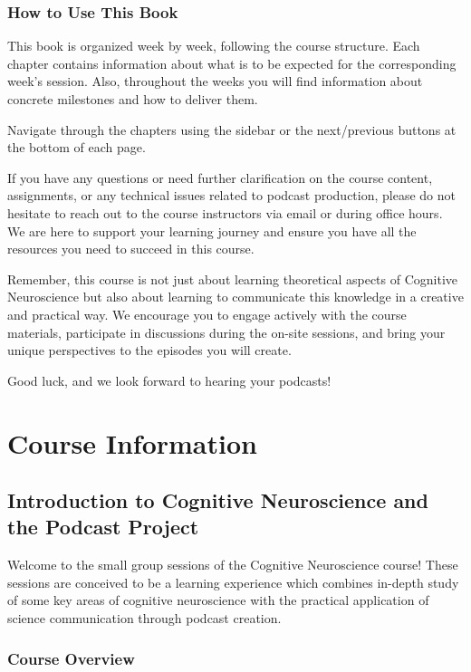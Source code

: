 \documentclass[
  letterpaper,
  DIV=11,
  numbers=noendperiod]{scrreprt}
\begin{document}
\section{How to Use This Book}\label{how-to-use-this-book}

This book is organized week by week, following the course structure.
Each chapter contains information about what is to be expected for the
corresponding week's session. Also, throughout the weeks you will find
information about concrete milestones and how to deliver them.

Navigate through the chapters using the sidebar or the next/previous
buttons at the bottom of each page.

If you have any questions or need further clarification on the course
content, assignments, or any technical issues related to podcast
production, please do not hesitate to reach out to the course
instructors via email or during office hours. We are here to support
your learning journey and ensure you have all the resources you need to
succeed in this course.

Remember, this course is not just about learning theoretical aspects of
Cognitive Neuroscience but also about learning to communicate this
knowledge in a creative and practical way. We encourage you to engage
actively with the course materials, participate in discussions during
the on-site sessions, and bring your unique perspectives to the episodes
you will create.

Good luck, and we look forward to hearing your podcasts!

\part{Course Information}

\chapter{Introduction to Cognitive Neuroscience and the Podcast
Project}\label{introduction-to-cognitive-neuroscience-and-the-podcast-project}

Welcome to the small group sessions of the Cognitive Neuroscience
course! These sessions are conceived to be a learning experience which
combines in-depth study of some key areas of cognitive neuroscience with
the practical application of science communication through podcast
creation.

\section{Course Overview}\label{course-overview}
\end{document}
